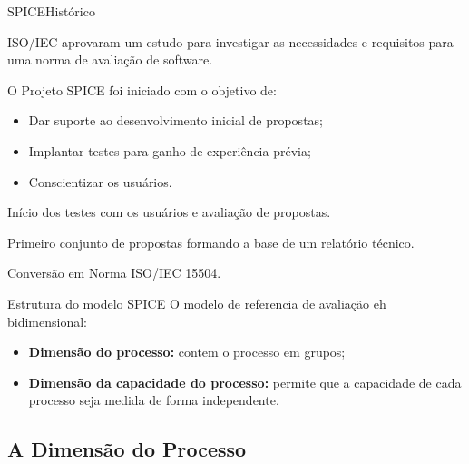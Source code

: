 \begin{frame}{SPICE}{Histórico}
   \begin{description}[<+->]
  \item[1991] ISO/IEC aprovaram um estudo para investigar as necessidades 
    e requisitos para uma norma de avaliação de software.
  \item[1993] O Projeto SPICE foi iniciado com o objetivo de:
    \begin{itemize}[<+->]
    \item Dar suporte ao desenvolvimento inicial de propostas;
    \item Implantar testes para ganho de experiência prévia;
    \item Conscientizar os usuários.
    \end{itemize}
  \item[1995] Início dos testes com os usuários e avaliação de propostas.
  \item[1995] Primeiro conjunto de propostas formando a base de um relatório 
    técnico.
  \item[1999--2003] Conversão em Norma ISO/IEC 15504.
  \end{description}
\end{frame}

\begin{frame}{Estrutura do modelo SPICE}
  O modelo de referencia de avaliação eh bidimensional:
  \begin{itemize}[<+->]
  \item {\bf Dimensão do processo:} contem o processo em grupos;
  \item {\bf Dimensão da capacidade do processo:} permite que a capacidade 
    de cada processo seja medida de forma independente.
  \end{itemize}
\end{frame}

\subsection{A Dimensão do Processo}


  
